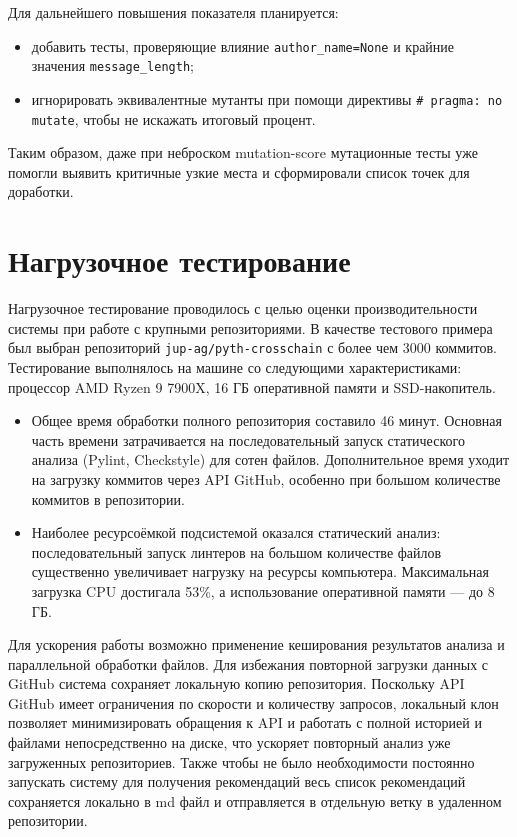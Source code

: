Для дальнейшего повышения показателя планируется:

\begin{itemize}
	\item добавить тесты, проверяющие влияние
	\verb|author_name=None| и крайние значения \verb|message_length|;
	\item игнорировать эквивалентные мутанты при помощи директивы
	\texttt{\# pragma: no mutate}, чтобы не искажать итоговый процент.
\end{itemize}

Таким образом, даже при неброском mutation-score
мутационные тесты уже помогли выявить критичные узкие места
и сформировали список точек для доработки.
	

\section{Нагрузочное тестирование}

Нагрузочное тестирование проводилось с целью оценки производительности системы при работе с крупными репозиториями. В качестве тестового примера был выбран репозиторий \texttt{jup-ag/pyth-crosschain} с более чем 3000 коммитов. Тестирование выполнялось на машине со следующими характеристиками: процессор AMD Ryzen 9 7900X, 16 ГБ оперативной памяти и SSD-накопитель.

\begin{itemize}
	\item Общее время обработки полного репозитория составило 46 минут. Основная часть времени затрачивается на последовательный запуск статического анализа (Pylint, Checkstyle) для сотен файлов. Дополнительное время уходит на загрузку коммитов через API GitHub, особенно при большом количестве коммитов в репозитории.
	
	\item Наиболее ресурсоёмкой подсистемой оказался статический анализ: последовательный запуск линтеров на большом количестве файлов существенно увеличивает нагрузку на ресурсы компьютера. Максимальная загрузка CPU достигала 53\%, а использование оперативной памяти — до 8 ГБ.
\end{itemize}
Для ускорения работы возможно применение кеширования результатов анализа и параллельной обработки файлов. Для избежания повторной загрузки данных с GitHub система сохраняет локальную копию репозитория. Поскольку API GitHub имеет ограничения по скорости и количеству запросов, локальный клон позволяет минимизировать обращения к API и работать с полной историей и файлами непосредственно на диске, что ускоряет повторный анализ уже загруженных репозиториев. Также чтобы не было необходимости постоянно запускать систему для получения рекомендаций весь список рекомендаций сохраняется локально в md файл и отправляется в отдельную ветку в удаленном репозитории.


